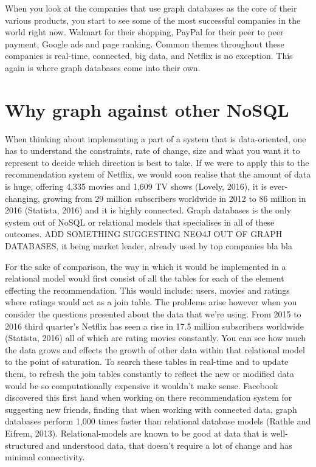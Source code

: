 \documentclass[a4paper]{article}
\begin{document}
When you look at the companies that use graph databases as the core of their various products, you start to see some of the most successful companies in the world right now. Walmart for their shopping, PayPal for their peer to peer payment, Google ads and page ranking. Common themes throughout these companies is real-time, connected, big data, and Netflix is no exception. This again is where graph databases come into their own.

\section{Why graph against other NoSQL}
\label{sec:Why graph against other NoSQL}

When thinking about implementing a part of a system that is data-oriented, one has to understand the constraints, rate of change, size and what you want it to represent to decide which direction is best to take. If we were to apply this to the recommendation system of Netflix, we would soon realise that the amount of data is huge, offering 4,335 movies and 1,609 TV shows (Lovely, 2016), it is ever-changing, growing from 29 million subscribers worldwide in 2012 to 86 million in 2016 (Statista, 2016) and it is highly connected. Graph databases is the only system out of NoSQL or relational models that specialises in all of these outcomes. ADD SOMETHING SUGGESTING NEO4J OUT OF GRAPH DATABASES, it being market leader, already used by top companies bla bla\par

For the sake of comparison, the way in which it would be implemented in a relational model would first consist of all the tables for each of the element effecting the recommendation. This would include: users, movies and ratings where ratings would act as a join table. The problems arise however when you consider the questions presented about the data that we're using. From 2015 to 2016 third quarter's Netflix has seen a rise in 17.5 million subscribers worldwide (Statista, 2016) all of which are rating movies constantly. You can see how much the data grows and effects the growth of other data within that relational model to the point of saturation. To search these tables in real-time and to update them, to refresh the join tables constantly to reflect the new or modified data would be so computationally expensive it wouldn't make sense. Facebook discovered this first hand when working on there recommendation system for suggesting new friends, finding that when working with connected data, graph databases perform 1,000 times faster than relational database models (Rathle and Eifrem, 2013). Relational-models are known to be good at data that is well-structured and understood data, that doesn't require a lot of change and has minimal connectivity.
\end{document}
